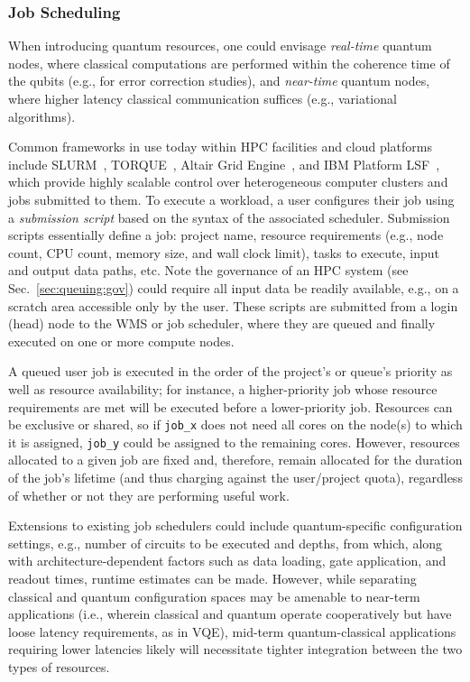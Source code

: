 \subsubsection{Job Scheduling}

When introducing quantum resources, one could envisage \textit{real-time} quantum nodes, where classical computations are performed within the coherence time of the qubits (e.g., for error correction studies), and \textit{near-time} quantum nodes, where higher latency classical communication suffices (e.g., variational algorithms).

Common frameworks in use today within HPC facilities and cloud platforms include SLURM~\cite{yoo2003slurm}, TORQUE~\cite{torqueengine}, Altair Grid Engine~\cite{altairgridengine}, and IBM Platform LSF~\cite{ibmlsf}, which provide highly scalable control over heterogeneous computer clusters and jobs submitted to them.
To execute a workload, a user configures their job using a \textit{submission script} based on the syntax of the associated scheduler.
Submission scripts essentially define a job:
project name, resource requirements (e.g., node count, CPU count, memory size, and wall clock limit), tasks to execute, input and output data paths, etc.
Note the governance of an HPC system (see Sec.~\ref{sec:queuing:gov}) could require all input data be readily available, e.g., on a scratch area accessible only by the user.
These scripts are submitted from a login (head) node to the WMS or job scheduler, where they are queued and finally executed on one or more compute nodes.

A queued user job is executed in the order of the project's or queue's priority as well as resource availability;
for instance, a higher-priority job whose resource requirements are met will be executed before a lower-priority job.
Resources can be exclusive or shared, so if \texttt{job\_x} does not need all cores on the node(s) to which it is assigned, \texttt{job\_y} could be assigned to the remaining cores.
However, resources allocated to a given job are fixed and, therefore, remain allocated for the duration
of the job's lifetime (and thus charging against the user/project quota), regardless of whether or not they are performing useful work.


Extensions to existing job schedulers could include quantum-specific configuration settings, e.g.,
number of circuits to be executed and depths, from which, along with architecture-dependent factors such as data loading, gate application, and readout times, runtime estimates can be made.
However, while separating classical and quantum configuration spaces may be amenable to near-term
applications (i.e., wherein classical and quantum operate cooperatively but have loose latency requirements, as in VQE),
mid-term quantum-classical applications requiring lower latencies likely will necessitate tighter integration between the two types of resources.



